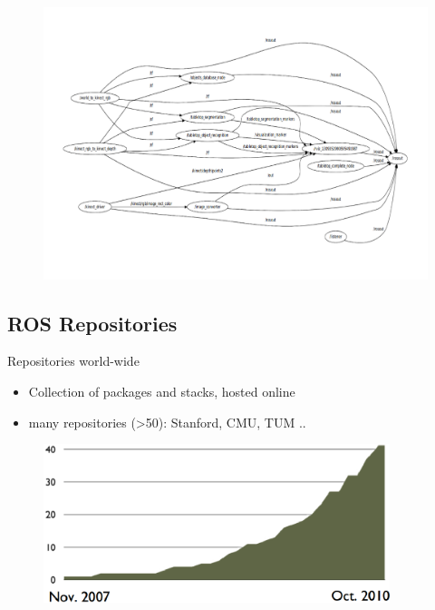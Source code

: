 \lyxframeend{}


\lyxframeend{}

\noindent \begin{center}
\begin{figure}[H]
\noindent \centering{}\includegraphics[bb=40bp 0bp 800bp 530bp,clip,width=1\textwidth]{images/ros_rxgraph}
\end{figure}

\par\end{center}


\lyxframeend{}


\lyxframeend{}\subsection{ROS Repositories}


\lyxframeend{}

Repositories world-wide
\begin{itemize}
\item Collection of packages and stacks, hosted online
\item many repositories (>50): Stanford, CMU, TUM ..
\end{itemize}
\noindent \begin{center}
\begin{figure}[H]
\noindent \centering{}\includegraphics[width=0.9\textwidth]{images/ROSReopGrowth}
\end{figure}

\par\end{center}


